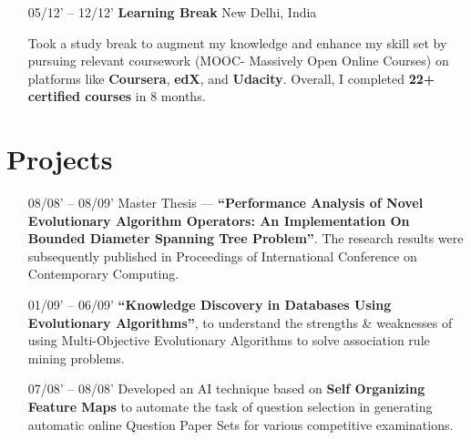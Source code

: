 \documentclass{article}
\begin{document}
\begin{itemize}[leftmargin=-1ex] \setlength\itemsep{0.25em}
    \item[05/12' – 12/12'] \textbf{Learning Break} \hfill New Delhi, India
   \item[] Took a study break to augment my knowledge and enhance my skill set by pursuing relevant coursework (MOOC- Massively Open Online Courses) on platforms like \textbf{Coursera}, \textbf{edX}, and \textbf{Udacity}. Overall, I completed \textbf{22+ certified courses} in 8 months.
\end{itemize}

\section{Projects}
\begin{itemize}[leftmargin=-1ex]\setlength\itemsep{0.25em}\vspace{5pt}
   \item[08/08' – 08/09'] Master Thesis  --- \textbf{``Performance Analysis of Novel Evolutionary Algorithm Operators: An Implementation On Bounded Diameter Spanning Tree Problem''}. The research results were subsequently published in Proceedings of International Conference on Contemporary Computing.
    \item[01/09' – 06/09'] \textbf{``Knowledge Discovery in Databases Using Evolutionary Algorithms''}, to understand the strengths \& weaknesses of using Multi-Objective Evolutionary Algorithms to solve association rule mining problems.
   \item[07/08' – 08/08']  Developed an AI technique based on \textbf{Self Organizing Feature Maps} to automate the task of question selection in generating automatic online Question Paper Sets for various competitive examinations.
\end{itemize}
\end{document}
